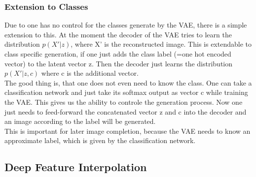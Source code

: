 \documentclass[
     11pt,         %
     a4paper,      %
     oneside,
     ]{article}
\begin{document}
\subsubsection{Extension to Classes}
Due to one has no control for the classes generate by the VAE, there is a simple extension to this. At the moment the decoder of the VAE tries to learn the distribution $p(X'|z)$, where X' is the reconstructed image. This is extendable to class specific generation, if one just adds the class label (=one hot encoded vector) to the latent vector z. Then the decoder just learns the distribution $p(X'|z,c)$ where c is the additional vector.\\
The good thing is, that one does not even need to know the class. One can take a classification network and just take its softmax output as vector c while training the VAE. This gives us the ability to controle the generation process. Now one just needs to feed-forward the concatenated vector z and c into the decoder and an image according to the label will be generated.\\
This is important for later image completion, because the VAE needs to know an approximate label, which is given by the classification network.

\subsection{Deep Feature Interpolation}
\end{document}
